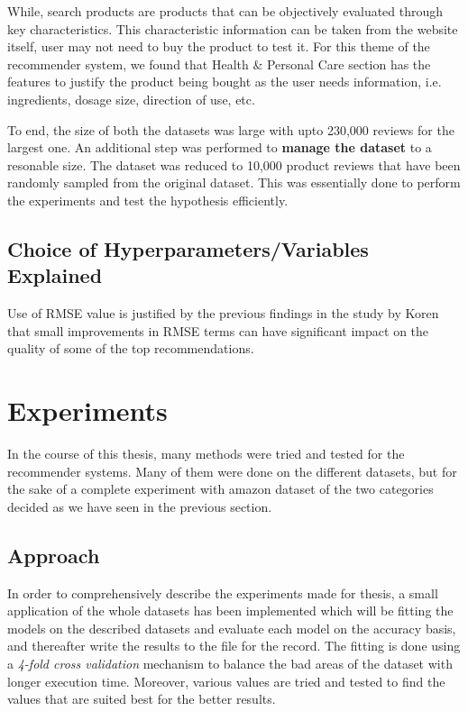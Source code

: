 While, search products are products that can be objectively evaluated through key characteristics. This characteristic information can be taken from the website itself, user may not need to buy the product to test it. For this theme of the recommender system, we found that Health \& Personal Care section has the features to justify the product being bought as the user needs information, i.e. ingredients, dosage size, direction of use, etc.

To end, the size of both the datasets was large with upto 230,000 reviews for the largest one. An additional step was performed to \textbf{manage the dataset} to a resonable size. The dataset was reduced to 10,000 product reviews that have been randomly sampled from the original dataset. This was essentially done to perform the experiments and test the hypothesis efficiently.


\subsection{Choice of Hyperparameters/Variables Explained}

Use of RMSE value is justified by the previous findings in the study by Koren \cite{Koren2010} \cite{Koren2008} that small improvements in RMSE terms can have significant impact on the quality of some of the top recommendations.

\section{Experiments}
In the course of this thesis, many methods were tried and tested for the recommender systems. Many of them were done on the different datasets, but for the sake of a complete experiment with amazon dataset of the two categories decided as we have seen in the previous section.

\subsection{Approach}
In order to comprehensively describe the experiments made for thesis, a small application of the whole datasets has been implemented which will be fitting the models on the described datasets and evaluate each model on the accuracy basis, and thereafter write the results to the file for the record. The fitting is done using a \textit{4-fold cross validation} mechanism to balance the bad areas of the dataset with longer execution time. Moreover, various values are tried and tested to find the values that are suited best for the better results. 


